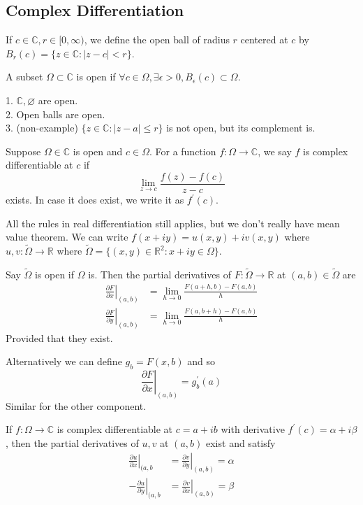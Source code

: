 \subsection{Complex Differentiation}
\begin{definition}
    If $c\in\mathbb C,r\in[0,\infty)$, we define the open ball of radius $r$ centered at $c$ by $B_r(c)=\{z\in\mathbb C:|z-c|<r\}$.
\end{definition}
\begin{definition}
    A subset $\Omega\subset\mathbb C$ is open if $\forall c\in\Omega,\exists\epsilon>0,B_\epsilon(c)\subset\Omega$.
\end{definition}
\begin{example}
    1. $\mathbb C,\varnothing$ are open.\\
    2. Open balls are open.\\
    3. (non-example) $\{z\in\mathbb C:|z-a|\le r\}$ is not open, but its complement is.
\end{example}
\begin{definition}
    Suppose $\Omega\in\mathbb C$ is open and $c\in\Omega$.
    For a function $f:\Omega\to\mathbb C$, we say $f$ is complex differentiable at $c$ if
    $$\lim_{z\to c}\frac{f(z)-f(c)}{z-c}$$
    exists.
    In case it does exist, we write it as $f^\prime(c)$.
\end{definition}
All the rules in real differentiation still applies, but we don't really have mean value theorem.
We can write $f(x+iy)=u(x,y)+iv(x,y)$ where $u,v:\tilde{\Omega}\to\mathbb R$ where $\tilde{\Omega}=\{(x,y)\in\mathbb R^2:x+iy\in\Omega\}$.
\begin{definition}
    Say $\tilde{\Omega}$ is open if $\Omega$ is.
    Then the partial derivatives of $F:\tilde{\Omega}\to\mathbb R$ at $(a,b)\in\tilde{\Omega}$ are
    \begin{align*}
        \left.\frac{\partial F}{\partial x}\right|_{(a,b)}&=\lim_{h\to 0}\frac{F(a+h,b)-F(a,b)}{h}\\
        \left.\frac{\partial F}{\partial y}\right|_{(a,b)}&=\lim_{h\to 0}\frac{F(a,b+h)-F(a,b)}{h}
    \end{align*}
    Provided that they exist.
\end{definition}
Alternatively we can define $g_b=F(x,b)$ and so
$$\left.\frac{\partial F}{\partial x}\right|_{(a,b)}=g^\prime_b(a)$$
Similar for the other component.
\begin{proposition}
    If $f:\Omega\to\mathbb C$ is complex differentiable at $c=a+ib$ with derivative $f^\prime(c)=\alpha+i\beta$, then the partial derivatives of $u,v$ at $(a,b)$ exist and satisfy
    \begin{align*}
        \left.\frac{\partial u}{\partial x}\right|_{(a,b}&= \left.\frac{\partial v}{\partial y}\right|_{(a,b)}=\alpha\\
        -\left.\frac{\partial u}{\partial y}\right|_{(a,b}&=\left.\frac{\partial v}{\partial x}\right|_{(a,b)}=\beta
    \end{align*}
\end{proposition}
